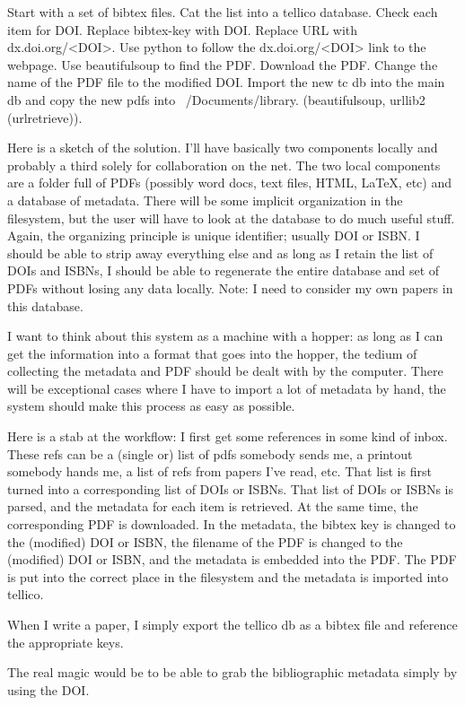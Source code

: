 \documentclass[letterpaper,12pt]{article}
\begin{document}
Start with a set of bibtex files. Cat the list into a tellico database. Check each item for DOI. Replace bibtex-key with DOI. Replace URL with dx.doi.org/<DOI>. Use python to follow the dx.doi.org/<DOI> link to the webpage. Use beautifulsoup to find the PDF. Download the PDF. Change the name of the PDF file to the modified DOI. Import the new tc db into the main db and copy the new pdfs into ~/Documents/library. (beautifulsoup, urllib2 (urlretrieve)).

Here is a sketch of the solution.
I'll have basically two components locally and probably a third solely for collaboration on the net. The two local components are a folder full of PDFs (possibly word docs, text files, HTML, \LaTeX, etc) and a database of metadata. There will be some implicit organization in the filesystem, but the user will have to look at the database to do much useful stuff. Again, the organizing principle is unique identifier; usually DOI or ISBN. I should be able to strip away everything else and as long as I retain the list of DOIs and ISBNs, I should be able to regenerate the entire database and set of PDFs without losing any data locally. Note: I need to consider my own papers in this database.

I want to think about this system as a machine with a hopper: as long as I can get the information into a format that goes into the hopper, the tedium of collecting the metadata and PDF should be dealt with by the computer. There will be exceptional cases where I have to import a lot of metadata by hand, the system should make this process as easy as possible.

Here is a stab at the workflow: I first get some references in some kind of inbox. These refs can be a (single or) list of pdfs somebody sends me, a printout somebody hands me, a list of refs from papers I've read, etc. That list is first turned into a corresponding list of DOIs or ISBNs. That list of DOIs or ISBNs is parsed, and the metadata for each item is retrieved. At the same time, the corresponding PDF is downloaded. In the metadata, the bibtex key is changed to the (modified) DOI or ISBN, the filename of the PDF is changed to the (modified) DOI or ISBN, and the metadata is embedded into the PDF. The PDF is put into the correct place in the filesystem and the metadata is imported into tellico.

When I write a paper, I simply export the tellico db as a bibtex file and reference the appropriate keys.

The real magic would be to be able to grab the bibliographic metadata simply by using the DOI.
\end{document}
